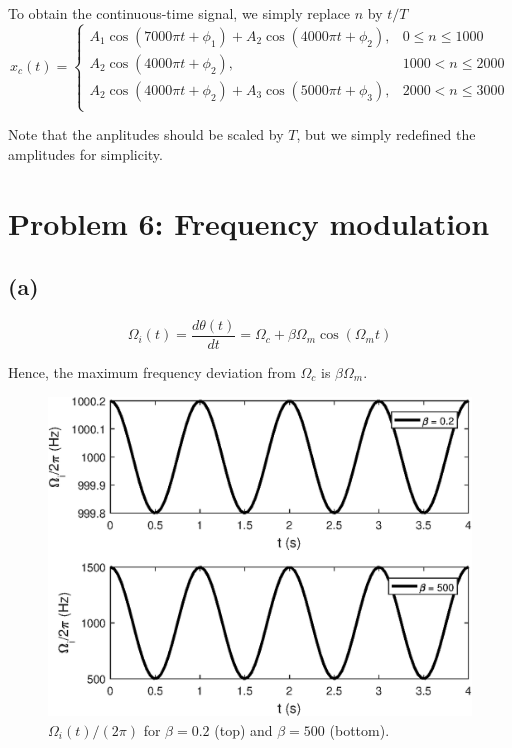 \documentclass{article}
\begin{document}
\begin{description}
	To obtain the continuous-time signal, we simply replace $n$ by $t/T$
	\begin{equation}
		x_c(t) = \begin{cases}
		A_1\cos(7000\pi t + \phi_1) + A_2\cos(4000\pi t + \phi_2), & 0 \leq n \leq 1000 \\
		A_2\cos(4000\pi t + \phi_2), & 1000 < n \leq 2000 \\
		A_2\cos(4000\pi t + \phi_2) + A_3\cos(5000\pi t + \phi_3), & 2000 < n \leq 3000 \\
		\end{cases}
	\end{equation}
	
	Note that the anplitudes should be scaled by $T$, but we simply redefined the amplitudes for simplicity. 
	
\end{description}

\section{Problem 6: Frequency modulation}

\subsection{(a)}

\begin{equation}
	\Omega_i(t) = \dfrac{d\theta(t)}{dt} = \Omega_c + \beta\Omega_m\cos(\Omega_mt)
\end{equation}

Hence, the maximum frequency deviation from $\Omega_c$ is $\beta\Omega_m$.

\FloatBarrier
\begin{figure}[h!]
	\centering
	\includegraphics[scale=0.8]{hw6_fm_a.eps}
	\caption{$\Omega_i(t)/(2\pi)$ for $\beta = 0.2$ (top) and $\beta = 500$ (bottom).}
\end{figure}
\FloatBarrier
\end{document}
